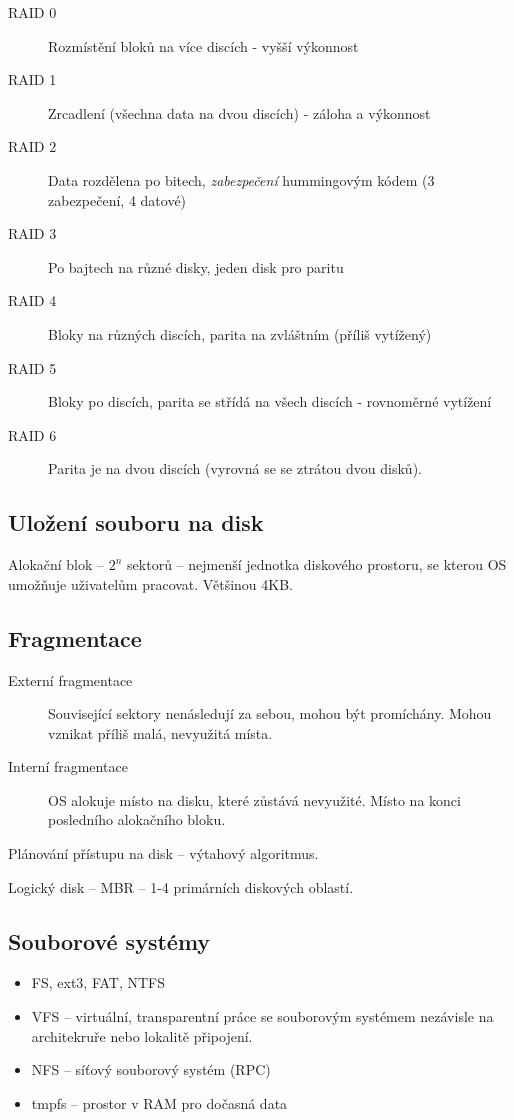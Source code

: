 \documentclass[a4wide]{report}
\begin{document}
\begin{description}
	\item[RAID 0] Rozmístění bloků na více discích - vyšší výkonnost
	\item[RAID 1] Zrcadlení (všechna data na dvou discích) - záloha a výkonnost
	\item[RAID 2] Data rozdělena po bitech, \emph{zabezpečení} hummingovým kódem (3 zabezpečení, 4 datové)
	\item[RAID 3] Po bajtech na různé disky, jeden disk pro paritu
	\item[RAID 4] Bloky na různých discích, parita na zvláštním (příliš vytížený)
	\item[RAID 5] Bloky po discích, parita se střídá na všech discích - rovnoměrné vytížení
	\item[RAID 6] Parita je na dvou discích (vyrovná se se ztrátou dvou disků).
\end{description}

\subsection{Uložení souboru na disk}

Alokační blok -- $2^n$ sektorů -- nejmenší jednotka diskového prostoru, se kterou OS umožňuje uživatelům pracovat. Většinou 4KB.

\subsection{Fragmentace}
\begin{description}
	\item[Externí fragmentace] Související sektory nenásledují za sebou, mohou být promíchány. Mohou vznikat příliš malá, nevyužitá místa.
	\item[Interní fragmentace] OS alokuje místo na disku, které zůstává nevyužité. Místo na konci posledního alokačního bloku.
\end{description}

Plánování přístupu na disk -- výtahový algoritmus.

Logický disk -- MBR -- 1-4 primárních diskových oblastí.

\subsection{Souborové systémy}
\begin{itemize}
	\item FS, ext3, FAT, NTFS
	\item VFS -- virtuální, transparentní práce se souborovým systémem nezávisle na architekruře nebo lokalitě připojení.
	\item NFS -- síťový souborový systém (RPC)
	\item tmpfs -- prostor v RAM pro dočasná data
\end{itemize} 
\end{document}
